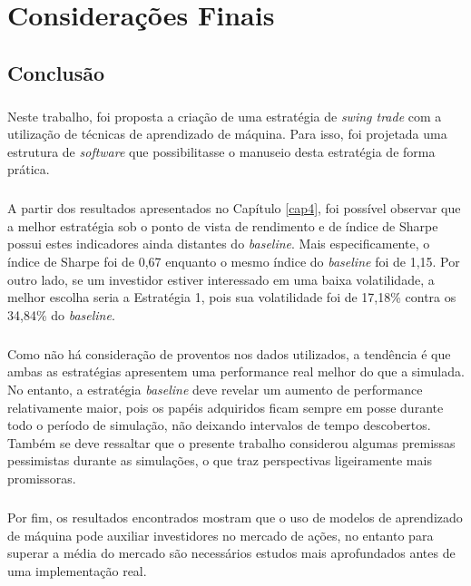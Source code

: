 \chapter{Considerações Finais}
\label{cap5}



\FloatBarrier
\section{Conclusão}



\paragraph{} Neste trabalho, foi proposta a criação de uma estratégia de \textit{swing trade} com a utilização de técnicas de aprendizado de máquina. Para isso, foi projetada uma estrutura de \textit{software} que possibilitasse o manuseio desta estratégia de forma prática.

\paragraph{} A partir dos resultados apresentados no Capítulo \ref{cap4}, foi possível observar que a melhor estratégia sob o ponto de vista de rendimento e de índice de Sharpe possui estes indicadores ainda distantes do \textit{baseline}. Mais especificamente, o índice de Sharpe foi de 0,67 enquanto o mesmo índice do \textit{baseline} foi de 1,15. Por outro lado, se um investidor estiver interessado em uma baixa volatilidade, a melhor escolha seria a Estratégia 1, pois sua volatilidade foi de 17,18\% contra os 34,84\% do \textit{baseline}.

\paragraph{} Como não há consideração de proventos nos dados utilizados, a tendência é que ambas as estratégias apresentem uma performance real melhor do que a simulada. No entanto, a estratégia \textit{baseline} deve revelar um aumento de performance relativamente maior, pois os papéis adquiridos ficam sempre em posse durante todo o período de simulação, não deixando intervalos de tempo descobertos. Também se deve ressaltar que o presente trabalho considerou algumas premissas pessimistas durante as simulações, o que traz perspectivas ligeiramente mais promissoras.

\paragraph{} Por fim, os resultados encontrados mostram que o uso de modelos de aprendizado de máquina pode auxiliar investidores no mercado de ações, no entanto para superar a média do mercado são necessários estudos mais aprofundados antes de uma implementação real.



